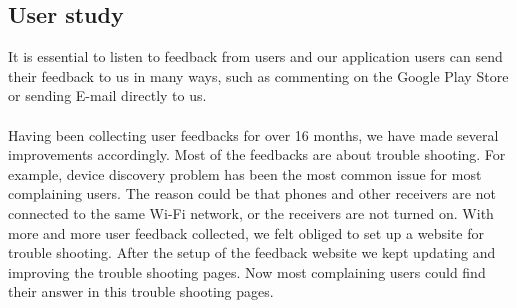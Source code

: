 \subsection{User study\label{4_3}}
It is essential to listen to feedback from users and our application users can send their feedback to us in many ways, such as commenting on the Google Play Store or sending E-mail directly to us.\\
\\
Having been collecting user feedbacks for over 16 months, we have made several improvements accordingly. Most of the feedbacks are about trouble shooting. For example, device discovery problem has been the most common issue for most complaining users. The reason could be that phones and other receivers are not connected to the same Wi-Fi network, or the receivers are not turned on. With more and more user feedback collected, we felt obliged to set up a website for trouble shooting. After the setup of the feedback website we kept updating and improving the trouble shooting pages. Now most complaining users could find their answer in this trouble shooting pages.
